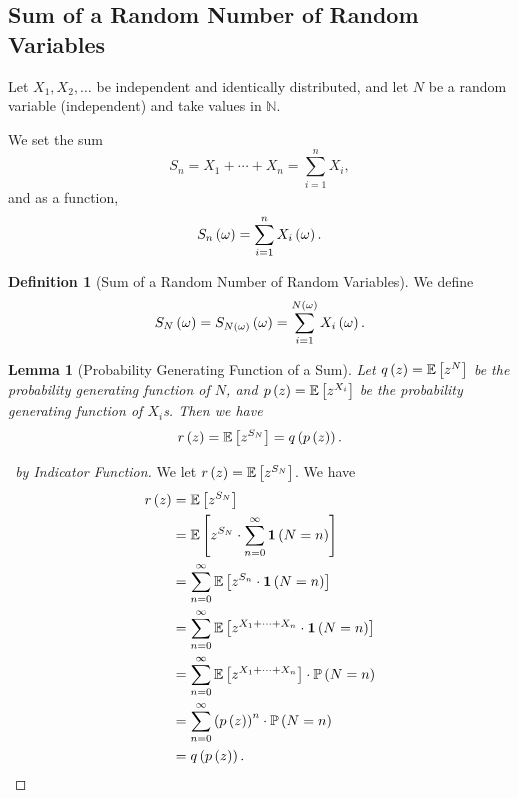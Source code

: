 \documentclass{article}
\newtheorem{lemma}[theorem]{Lemma}
\theoremstyle{definition}
\newtheorem{definition}[theorem]{Definition}
\theoremstyle{remark}
\newcommand{\NN}{\mathbb{N}}
\newcommand{\Prob}{\mathbb{P}}
\newcommand{\Expt}{\mathbb{E}}
\newcommand{\indicator}{\mathbf{1}}
\begin{document}
\subsection{Sum of a Random Number of Random Variables}

Let \(X_1, X_2, \ldots\) be independent and identically distributed, and let \(N\) be a random variable (independent) and take values in \(\NN\).

We set the sum
\[
    S_n = X_1 + \cdots + X_n = \sum_{i = 1}^{n} X_i,
\]
and as a function,
\[
    S_n\left(\omega\right) = \sum_{i = 1}^{n} X_i\left(\omega\right).
\]

\begin{definition}[Sum of a Random Number of Random Variables]
    \label{def:sum-random-number-rvs}%
    We define
    \[
        S_N \left(\omega\right) = S_{N\left(\omega\right)} \left(\omega\right) = \sum_{i = 1}^{N\left(\omega\right)} X_i\left(\omega\right).
    \]
\end{definition}

\begin{lemma}[Probability Generating Function of a Sum]
    \label{lem:pgf-sum}%
    Let \(q\pqty{z} = \Expt\bqty{z^N}\) be the probability generating function of \(N\), and \(p\pqty{z} = \Expt\bqty{z^{X_i}}\) be the probability generating function of \(X_i\)s. Then we have
    \[
        r\pqty{z} = \Expt\bqty{z^{S_N}} = q\pqty{p\pqty{z}}.
    \]
\end{lemma}

\begin{proof}[\proofname\ by Indicator Function]
    We let \(r\pqty{z} = \Expt\bqty{z^{S_N}}\). We have
    \begin{align*}
        r\pqty{z} &= \Expt\bqty{z^{S_N}} \\
        &= \Expt\bqty{z^{S_N} \cdot \sum_{n = 0}^{\infty}  \indicator\pqty{N = n}} \\
        &= \sum_{n = 0}^{\infty} \Expt\bqty{z^{S_n} \cdot \indicator \pqty{N = n}} \\
        &= \sum_{n = 0}^{\infty} \Expt\bqty{z^{X_1 + \cdots + X_n} \cdot \indicator\pqty{N = n}} \\
        &= \sum_{n = 0}^{\infty} \Expt\bqty{z^{X_1 + \cdots + X_n}} \cdot \Prob\pqty{N = n} \\
        &= \sum_{n = 0}^{\infty} \pqty{p\pqty{z}}^{n} \cdot \Prob\pqty{N = n} \\
        &= q\pqty{p\pqty{z}}.
    \end{align*}
\end{proof}
\end{document}
